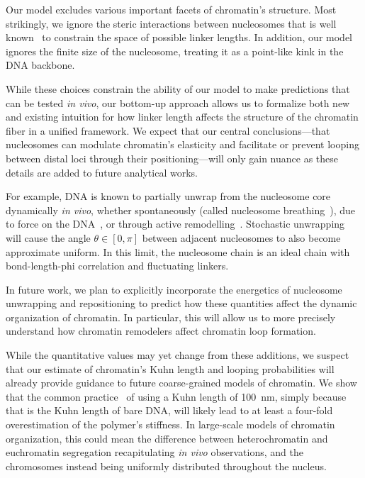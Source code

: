 \documentclass[%
 reprint,
superscriptaddress,
showpacs,preprintnumbers,
 amsmath,amssymb,
 aps,
 prl,
]{revtex4-1}
\begin{document}
Our model excludes various important facets of chromatin's structure.
Most strikingly, we ignore the steric interactions between nucleosomes that is
    well known~\cite{widom1992} to constrain the space of possible linker
    lengths.
In addition, our model ignores the finite size of the nucleosome, treating it as
    a point-like kink in the DNA backbone.

While these choices constrain the ability of our model to make predictions that
    can be tested \textit{in vivo}, our bottom-up approach allows us to
    formalize both new and existing intuition for how linker length affects the
    structure of the chromatin fiber in a unified framework.
We expect that our central conclusions---that nucleosomes can modulate
    chromatin's elasticity and facilitate or prevent looping between distal loci
    through their positioning---will only gain nuance as these details are added
    to future analytical works.

    For example, DNA is known to partially unwrap from the nucleosome core dynamically \textit{in
    vivo}, whether spontaneously (called nucleosome breathing~\cite{TODO}), due to
    force on the DNA~\cite{TODO}, or through active
    remodelling~\cite{dion2007,kulaeva2007,senavirathne2017}. Stochastic
    unwrapping will cause the angle $\theta \in [0, \pi]$ between adjacent nucleosomes to
    also become approximate uniform. In this limit, the nucleosome chain is an
    ideal chain with bond-length-phi correlation and fluctuating linkers.

    In future work, we plan to explicitly incorporate the energetics of nucleosome unwrapping
    and repositioning to predict how these quantities affect the dynamic
    organization of chromatin. In particular, this will allow us to more
    precisely understand how chromatin remodelers affect chromatin loop
    formation.

While the quantitative values may yet change from these additions, we suspect that our estimate of chromatin's Kuhn length and looping probabilities will already provide
    guidance to future coarse-grained models of chromatin.
We show that the common practice~\cite{macphersonInPress,nuebler2018}
    of using a Kuhn length of \SI{100}{\nano\metre}, simply because that is the
    Kuhn length of bare DNA, will likely lead to at least a four-fold
    overestimation of the polymer's stiffness. %
In large-scale models of chromatin organization, this could mean the difference
    between heterochromatin and euchromatin segregation recapitulating
    \textit{in vivo} observations, and the chromosomes instead being uniformly
    distributed throughout the nucleus.
\end{document}

